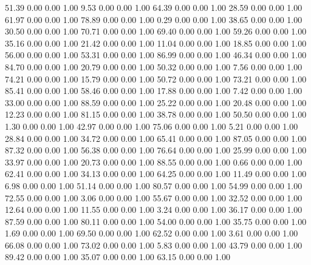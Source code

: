    51.39   0.00   0.00   1.00
    9.53   0.00   0.00   1.00
   64.39   0.00   0.00   1.00
   28.59   0.00   0.00   1.00
   61.97   0.00   0.00   1.00
   78.89   0.00   0.00   1.00
    0.29   0.00   0.00   1.00
   38.65   0.00   0.00   1.00
   30.50   0.00   0.00   1.00
   70.71   0.00   0.00   1.00
   69.40   0.00   0.00   1.00
   59.26   0.00   0.00   1.00
   35.16   0.00   0.00   1.00
   21.42   0.00   0.00   1.00
   11.04   0.00   0.00   1.00
   18.85   0.00   0.00   1.00
   56.00   0.00   0.00   1.00
   53.31   0.00   0.00   1.00
   86.99   0.00   0.00   1.00
   46.34   0.00   0.00   1.00
   84.70   0.00   0.00   1.00
   20.79   0.00   0.00   1.00
   50.32   0.00   0.00   1.00
    7.56   0.00   0.00   1.00
   74.21   0.00   0.00   1.00
   15.79   0.00   0.00   1.00
   50.72   0.00   0.00   1.00
   73.21   0.00   0.00   1.00
   85.41   0.00   0.00   1.00
   58.46   0.00   0.00   1.00
   17.88   0.00   0.00   1.00
    7.42   0.00   0.00   1.00
   33.00   0.00   0.00   1.00
   88.59   0.00   0.00   1.00
   25.22   0.00   0.00   1.00
   20.48   0.00   0.00   1.00
   12.23   0.00   0.00   1.00
   81.15   0.00   0.00   1.00
   38.78   0.00   0.00   1.00
   50.50   0.00   0.00   1.00
    1.30   0.00   0.00   1.00
   42.97   0.00   0.00   1.00
   75.06   0.00   0.00   1.00
    5.21   0.00   0.00   1.00
   28.84   0.00   0.00   1.00
   34.72   0.00   0.00   1.00
   65.41   0.00   0.00   1.00
   87.05   0.00   0.00   1.00
   87.32   0.00   0.00   1.00
   56.38   0.00   0.00   1.00
   76.64   0.00   0.00   1.00
   25.99   0.00   0.00   1.00
   33.97   0.00   0.00   1.00
   20.73   0.00   0.00   1.00
   88.55   0.00   0.00   1.00
    0.66   0.00   0.00   1.00
   62.41   0.00   0.00   1.00
   34.13   0.00   0.00   1.00
   64.25   0.00   0.00   1.00
   11.49   0.00   0.00   1.00
    6.98   0.00   0.00   1.00
   51.14   0.00   0.00   1.00
   80.57   0.00   0.00   1.00
   54.99   0.00   0.00   1.00
   72.55   0.00   0.00   1.00
    3.06   0.00   0.00   1.00
   55.67   0.00   0.00   1.00
   32.52   0.00   0.00   1.00
   12.64   0.00   0.00   1.00
   11.55   0.00   0.00   1.00
    3.24   0.00   0.00   1.00
   36.17   0.00   0.00   1.00
   87.59   0.00   0.00   1.00
   80.11   0.00   0.00   1.00
   54.00   0.00   0.00   1.00
   35.75   0.00   0.00   1.00
    1.69   0.00   0.00   1.00
   69.50   0.00   0.00   1.00
   62.52   0.00   0.00   1.00
    3.61   0.00   0.00   1.00
   66.08   0.00   0.00   1.00
   73.02   0.00   0.00   1.00
    5.83   0.00   0.00   1.00
   43.79   0.00   0.00   1.00
   89.42   0.00   0.00   1.00
   35.07   0.00   0.00   1.00
   63.15   0.00   0.00   1.00
